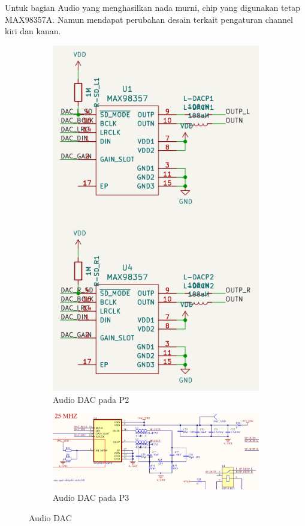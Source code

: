 \documentclass{book} %
\begin{document}
    Untuk bagian Audio yang menghasilkan nada murni, chip yang digunakan tetap MAX98357A.
    Namun mendapat perubahan desain terkait pengaturan channel kiri dan kanan.
    
    \begin{figure}[!ht]
    	\centering
    	\begin{subfigure}[t]{0.25\textwidth}
    		\includegraphics[width=\textwidth]{images/p2_dac}
    		\caption{Audio DAC pada P2}
    	\end{subfigure}
    	\begin{subfigure}[t]{0.60\textwidth}
    		\includegraphics[width=\textwidth]{images/p3_dac}
    		\caption{Audio DAC pada P3}
    	\end{subfigure}
    	\caption{Audio DAC}
    \end{figure}
\end{document}
